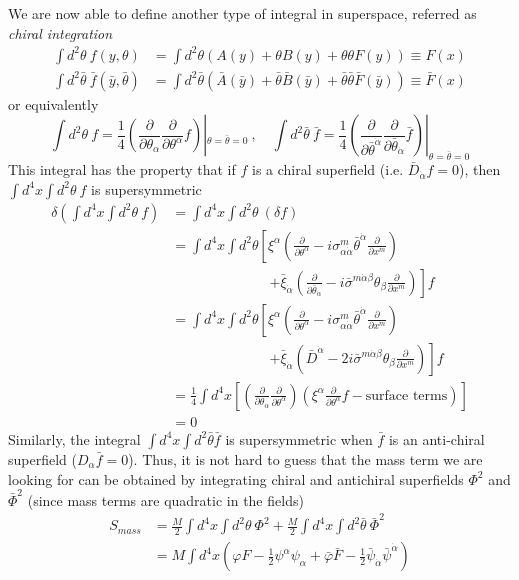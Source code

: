 \documentclass[a4paper,12pt]{article}
\numberwithin{equation}{section}
\numberwithin{exe}{section}
\newcommand{\p}{{\partial}}
\newcommand{\Db}{{\bar D}}
\newcommand{\yb}{{\bar y}}
\newcommand{\Fb}{{\bar F}}
\renewcommand{\a}{{\alpha}}
\newcommand{\ad}{{\dot\alpha}}
\renewcommand{\b}{{\beta}}
\renewcommand{\d}{{\delta}}
\newcommand{\s}{{\sigma}}
\renewcommand{\sb}{{\bar\sigma}}
\renewcommand{\t}{{\theta}}
\newcommand{\tb}{{\bar\theta}}
\newcommand{\vphi}{{\varphi}}
\newcommand{\vphib}{{\bar\varphi}}
\newcommand{\xib}{{\bar\xi}}
\newcommand{\Phib}{{\bar \Phi}}
\newcommand{\psib}{{\bar\psi}}
\begin{document}
We are now able to define another type of integral in superspace, referred as {\it chiral integration}
	\begin{align}
	\int d^2 \t\ f(y,\t) & = \int d^2\t (A(y) + \t B(y) + \t\t F(y)) \equiv F(x) \\
	\int d^2\tb\ \bar f(\yb, \tb) & = \int d^2 \tb (\bar A(\yb) + \tb \bar B(\yb) + \tb\tb\bar F(\yb)) \equiv \Fb(x)
	\end{align}
or equivalently
	\begin{equation}
	\int d^2\t\ f = \frac14\left(\frac{\p}{\p\t_\a}\frac{\p}{\p\t^\a}f\right)|_{\t = \tb = 0}\ ,\quad\int d^2\tb\ \bar f = \frac14\left(\frac{\p}{\p\tb^\ad}\frac{\p}{\p\tb_\ad}\bar f\right)|_{\t=\tb=0}
	\end{equation}
This integral has the property that if $f$ is a chiral superfield (i.e. $\Db_\ad f=0$), then $\int d^4 x\int d^2\t\ f$ is supersymmetric
	\begin{align}
	\d\left( \int d^4 x\int d^2\t\ f\right) & = \int d^4 x\int d^2\t\ (\d f) \nonumber \\
	& = \int d^4 x\int d^2\t \left[\xi^\a\left(\frac{\p}{\p\t^\a}-i\s^m_{\a\ad}\tb^\ad\frac{\p}{\p x^m}\right) \right. \nonumber \\
	& \qquad\qquad\qquad\quad  \left. + \xib_\ad\left(\frac{\p}{\p\tb_\ad}-i\sb^{m\ad\b}\t_\b\frac{\p}{\p x^m}\right) \right]f \nonumber \\
	& = \int d^4 x\int d^2\t \left[\xi^\a\left(\frac{\p}{\p\t^\a}-i\s^m_{\a\ad}\tb^\ad\frac{\p}{\p x^m}\right) \right. \nonumber \\
	& \qquad\qquad\qquad\quad \left. + \xib_\ad\left(\Db^\ad - 2i\sb^{m\ad\b}\t_\b\frac{\p}{\p x^m}\right) \right]f \nonumber \\
	& = \frac14 \int d^4 x\left[\left(\frac{\p}{\p\t_\a}\frac{\p}{\p\t^\a}\right)\left(\xi^\a\frac{\p}{\p\t^\a}f-\text{surface terms}\right)\right] \nonumber \\
	& = 0
	\end{align}
Similarly, the integral $\int d^4 x\int d^2 \tb\bar f$ is supersymmetric when $\bar f$ is an anti-chiral superfield ($D_\a \bar f = 0$). Thus, it is not hard to guess that the mass term we are looking for can be obtained by integrating chiral and antichiral superfields $\Phi^2$ and $\Phib^2$ (since mass terms are quadratic in the fields)
	\begin{align}
	S_{mass} & = \frac{M}{2} \int d^4 x\int d^2\t\ \Phi^2 + \frac{M}{2} \int d^4 x \int d^2 \tb\ \Phib^2 \nonumber \\
	& = M\int d^4 x \left( \vphi F - \frac12 \psi^\a \psi_\a + \vphib \Fb - \frac12 \psib_\ad \psib^\ad\right)
	\end{align}
\end{document}
